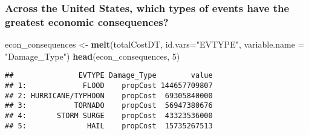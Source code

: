 \documentclass[]{article}
\newenvironment{Shaded}{\begin{snugshade}}{\end{snugshade}}
\newcommand{\KeywordTok}[1]{\textcolor[rgb]{0.13,0.29,0.53}{\textbf{#1}}}
\newcommand{\DataTypeTok}[1]{\textcolor[rgb]{0.13,0.29,0.53}{#1}}
\newcommand{\DecValTok}[1]{\textcolor[rgb]{0.00,0.00,0.81}{#1}}
\newcommand{\StringTok}[1]{\textcolor[rgb]{0.31,0.60,0.02}{#1}}
\newcommand{\NormalTok}[1]{#1}
\begin{document}
\subsubsection{Across the United States, which types of events have the
greatest economic
consequences?}\label{across-the-united-states-which-types-of-events-have-the-greatest-economic-consequences}

\begin{Shaded}
\begin{Highlighting}[]
\NormalTok{econ_consequences <-}\StringTok{ }\KeywordTok{melt}\NormalTok{(totalCostDT, }\DataTypeTok{id.vars=}\StringTok{"EVTYPE"}\NormalTok{, }\DataTypeTok{variable.name =} \StringTok{"Damage_Type"}\NormalTok{)}
\KeywordTok{head}\NormalTok{(econ_consequences, }\DecValTok{5}\NormalTok{)}
\end{Highlighting}
\end{Shaded}

\begin{verbatim}
##               EVTYPE Damage_Type        value
## 1:             FLOOD    propCost 144657709807
## 2: HURRICANE/TYPHOON    propCost  69305840000
## 3:           TORNADO    propCost  56947380676
## 4:       STORM SURGE    propCost  43323536000
## 5:              HAIL    propCost  15735267513
\end{verbatim}
\end{document}

